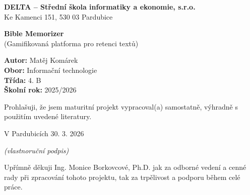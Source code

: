 \documentclass[12pt, a4paper, oneside]{article}
\begin{document}
	
	
	\begin{titlepage}
		\begin{center}
			\vspace*{1cm}
			
			{\Large \textbf{DELTA – Střední škola informatiky a ekonomie, s.r.o.}} \\
			\vspace{0.5cm}
			{\large Ke Kamenci 151, 530 03 Pardubice}
			
			\vspace{5cm}
			
			{\Huge \textbf{Bible Memorizer}} \\
			\vspace{5mm}
			{\Large (Gamifikovaná platforma pro retenci textů)}
			
			\vfill
			
			\begin{flushleft}
				\large
				\textbf{Autor:} Matěj Komárek \\
				\textbf{Obor:} Informační technologie \\ 
				\textbf{Třída:} 4. B \\
				\textbf{Školní rok:} 2025/2026
			\end{flushleft}
			
		\end{center}
	\end{titlepage}
	

	


	\newpage
	\thispagestyle{empty}
	
	Prohlašuji, že jsem maturitní projekt vypracoval(a) samostatně, výhradně s použitím uvedené literatury.
		
	\vspace{1cm}
	
	V Pardubicích 30. 3. 2026
	
	\begin{flushright}
		\textit{(vlastnoruční podpis)}
	\end{flushright}
	
	
	\newpage
	\thispagestyle{empty}
	\vspace*{12cm}
	
	
	Upřímně děkuji Ing. Monice Borkovcové, Ph.D. jak za odborné vedení a cenné rady při zpracování tohoto projektu, tak za trpělivost a podporu během celé práce.
	
	
	\newpage
	\thispagestyle{empty}
	
\end{document}
